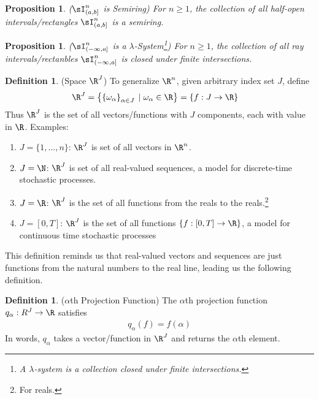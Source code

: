 \documentclass[12pt]{article}
\theoremstyle{plain}
\newtheorem{prop}[thm]{Proposition}
\theoremstyle{definition}
\newtheorem{defn}[thm]{Definition}
\theoremstyle{remark}
\newcommand{\ra}{\rightarrow}
\begin{document}
\begin{prop}
\emph{($\sI_{(a,b]}^n$ is Semiring)}
\label{prop:borelsemi}
For $n\geq 1$, the collection of all half-open intervals/rectangles
$\sI_{(a,b]}^n$ is a semiring.
\end{prop}

\begin{prop}
\emph{($\sI_{(-\infty,a]}^n$ is a $\lambda$-System\footnote{%
  A $\lambda$-system is a collection closed under finite intersections.
})}
\label{prop:borellambda}
For $n\geq 1$, the collection of all ray intervals/rectanbles
$\sI_{(-\infty,a]}^n$ is closed under finite intersections.
\end{prop}

\begin{defn}(Space $\R^J$)
To generalize $\R^n$, given arbitrary index set $J$, define
\begin{align*}
  \R^J &=
  \left\{
    \left\{ \omega_\alpha \right\}_{\alpha\in J}
    \; | \;
    \omega_\alpha \in \R
  \right\}
  =
  \left\{
    f: J \ra \R
  \right\}
\end{align*}
Thus $\R^J$ is the set of all vectors/functions with $J$ components,
each with value in $\R$. Examples:
\begin{enumerate}
  \item $J=\{1,\ldots,n\}$: $\R^J$ is set of all vectors in $\R^n$.
  \item $J=\N$: $\R^J$ is set of all real-valued sequences,
    a model for discrete-time stochastic processes.
  \item $J=\R$: $\R^J$ is the set of all functions from the reals to the
    reals.\footnote{For reals.}
  \item $J=[0,T]$: $\R^J$ is the set of all functions
    $\{f:[0,T]\ra\R\}$, a model for continuous time stochastic processes
\end{enumerate}
This definition reminds us that real-valued vectors and sequences are
just functions from the natural numbers to the real line,
leading us the following definition.
\end{defn}

\begin{defn}($\alpha$th Projection Function)
The $\alpha$th projection function $q_\alpha:R^J\ra\R$
satisfies
\begin{align*}
  q_\alpha(f) = f(\alpha)
\end{align*}
In words, $q_\alpha$ takes a vector/function in $\R^J$ and returns the
$\alpha$th element.
\end{defn}
\end{document}
